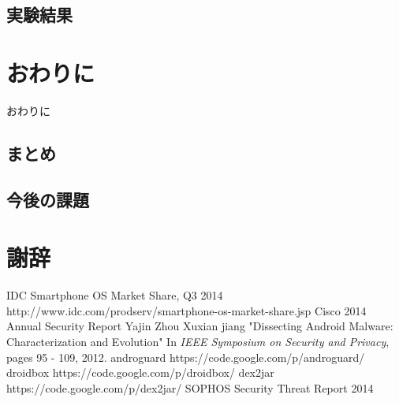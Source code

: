 \documentclass[12pt]{jsarticle}
\begin{document}
\subsection{実験結果}


\newpage
\section{おわりに}
\label{sec:concl}
おわりに
\subsection{まとめ}

\subsection{今後の課題}

\newpage
\section*{謝辞}
\begin{thebibliography}{9}
	 IDC Smartphone OS Market Share, Q3 2014 \\http://www.idc.com/prodserv/smartphone-os-market-share.jsp
	 Cisco 2014 Annual Security Report
	 Yajin Zhou Xuxian jiang "Dissecting Android Malware: Characterization and Evolution" In {\it IEEE Symposium on Security and Privacy}, pages 95 - 109, 2012.
	 androguard https://code.google.com/p/androguard/
	 droidbox https://code.google.com/p/droidbox/
	 dex2jar https://code.google.com/p/dex2jar/
	 SOPHOS Security Threat Report 2014
\end{thebibliography}
\end{document}
